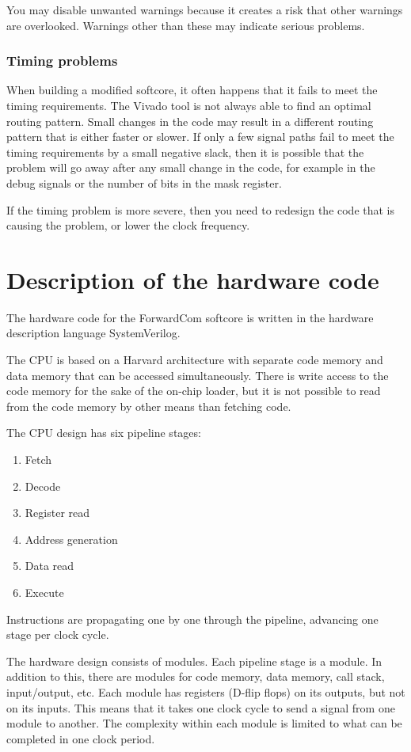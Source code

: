 \documentclass[11pt,a4paper,oneside,openright]{report}
\newcommand{\vv}{ \vspace{2mm} }   %
\begin{document}
You may disable unwanted warnings because it creates a risk that other warnings are overlooked. Warnings other than these may indicate serious problems.
\vv

\subsubsection{Timing problems}
When building a modified softcore, it often happens that it fails to meet the timing requirements. The Vivado tool is not always able to find an optimal routing pattern. Small changes in the code may result in a different routing pattern that is either faster or slower. If only a few signal paths fail to meet the timing requirements by a small negative slack, then it is possible that the problem will go away after any small change in the code, for example in the debug signals or the number of bits in the mask register.
\vv

If the timing problem is more severe, then you need to redesign the code that is causing the problem, or lower the clock frequency.
\vv

\section{Description of the hardware code} \label{Chap:DescriptionHWCode}
The hardware code for the ForwardCom softcore is written in the hardware description language SystemVerilog. 
\vv

The CPU is based on a Harvard architecture with separate code memory and data memory that can be accessed simultaneously. There is write access to the code memory for the sake of the on-chip loader, but it is not possible to read from the code memory by other means than fetching code.
\vv

The CPU design has six pipeline stages:
\vv

\begin{enumerate}
\item Fetch
\item Decode
\item Register read
\item Address generation
\item Data read
\item Execute
\end{enumerate}
\vv

Instructions are propagating one by one through the pipeline, advancing one stage per clock cycle.
\vv

The hardware design consists of modules. Each pipeline stage is a module. In addition to this, there are modules for code memory, data memory, call stack, input/output, etc. Each module has registers (D-flip flops) on its outputs, but not on its inputs. This means that it takes one clock cycle to send a signal from one module to another. The complexity within each module is limited to what can be completed in one clock period.
\vv
\end{document}
